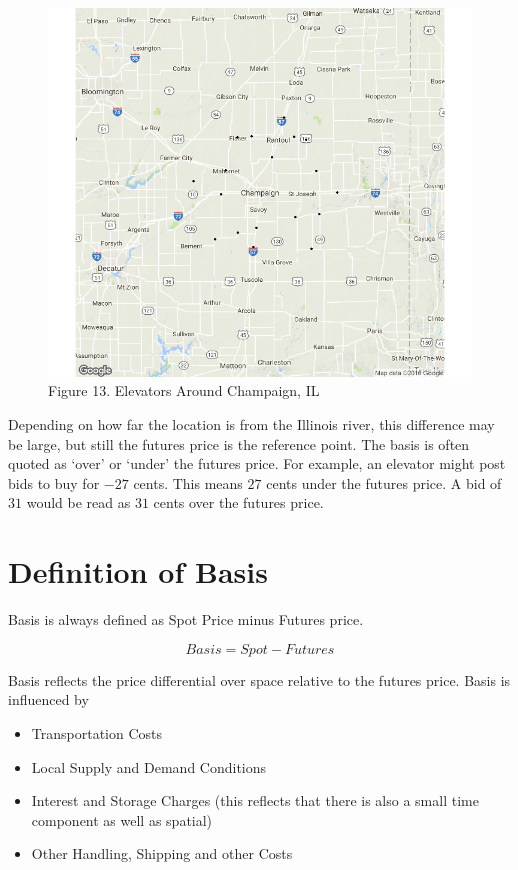 \documentclass[]{book}
\providecommand{\tightlist}{%
  \setlength{\itemsep}{0pt}\setlength{\parskip}{0pt}}
\theoremstyle{definition}
\theoremstyle{definition}
\theoremstyle{remark}
\begin{document}
\begin{figure}[htbp]
\centering
\includegraphics{images/Champaign-Elevators.png}
\caption{Figure 13. Elevators Around Champaign, IL}
\end{figure}

Depending on how far the location is from the Illinois river, this
difference may be large, but still the futures price is the reference
point. The basis is often quoted as `over' or `under' the futures price.
For example, an elevator might post bids to buy for \(-27\) cents. This
means \(27\) cents under the futures price. A bid of \(31\) would be
read as \(31\) cents over the futures price.

\section{Definition of Basis}\label{definition-of-basis}

Basis is always defined as Spot Price minus Futures price.

\[Basis = Spot - Futures\]

Basis reflects the price differential over space relative to the futures
price. Basis is influenced by

\begin{itemize}
\tightlist
\item
  Transportation Costs
\item
  Local Supply and Demand Conditions
\item
  Interest and Storage Charges (this reflects that there is also a small
  time component as well as spatial)
\item
  Other Handling, Shipping and other Costs
\end{itemize}
\end{document}
